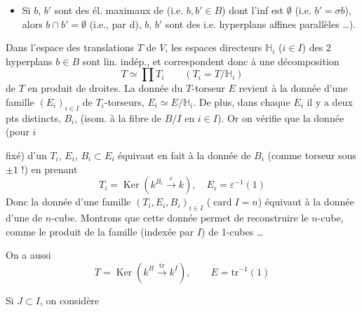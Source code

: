 \documentclass[11pt,a4paper]{article}
\begin{document}
\begin{itemize}
  \item[e)] Si $b$, $b'$ sont des él. maximaux de \uncertain{$\Phi^{**}$}
    (i.e. $b, b' \in B$) dont l'inf est $\emptyset$ (i.e. $b' = \sigma b$),
    alors \struck{\ill{}} $b \cap b' = \emptyset$ (i.e., \struck{\ill{}} par
    d), \struck{\ill{}} $b$, $b'$ sont des  i.e.
    hyperplans affines parallèles …).
\end{itemize}

Dans l'espace des translations $T$ de $V$, les \struck{\ill{}} espaces
directeurs $\mathbb{H}_i$ ($i \in I$) des \struck{\ill{}} 2
 hyperplans \ill{} $b \in B$ sont lin. indép.,
et correspondent donc à une décomposition
\[
  T \simeq \prod T_i \qquad (T_i = T/\mathbb{H}_i)
\]
de $T$ en produit de droites. La donnée du $T$-torseur $E$ revient à la
donnée d'une famille $(E_i)_{i \in I}$ de $T_i$-torseurs,
$E_i \simeq E/\mathbb{H}_i$. De plus, dans chaque $E_i$ il y a
 deux pts distincts, \struck{\ill{}} $B_i$,
(isom. à la fibre de $B/I$ en $i \in I$). Or on vérifie que la donnée
 (pour $i$


fixé) d'un $T_i$, $E_i$, $B_i \subset E_i$ équivaut en fait à la donnée de
$B_i$ (comme torseur sous $\pm 1$ !) en prenant
\[
  T_i = \operatorname{Ker}(k^{B_i} \xrightarrow{\varepsilon} k), \quad
  E_i = \varepsilon^{-1}(1)
\]
Donc la donnée  d'une famille $(T_i, E_i, B_i)_{i \in I}$
($\operatorname{card} I = n$) équivaut à la donnée d'une \ill{} de
$n$-cube. Montrons que cette donnée permet de reconstruire le $n$-cube,
comme le produit de la famille (indexée par $I$) de 1-cubes …

On a aussi
\[
  T = \operatorname{Ker}(k^B \xrightarrow{\mathrm{tr}} k^I), \qquad
  E = \mathrm{tr}^{-1}(1)
\]

Si $J \subset I$, on considère
\end{document}
